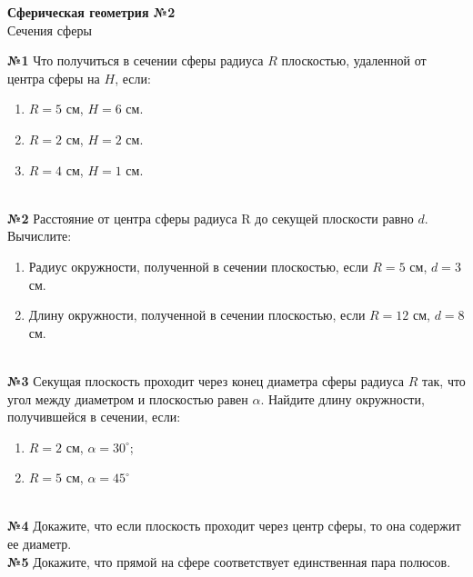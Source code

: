 


    \begin{center}
        \textbf{Сферическая геометрия №2}\\
        Сечения сферы
    \end{center}

    \textbf{№1} Что получиться в сечении сферы радиуса $R$ плоскостью, удаленной от центра сферы на $H$, если:\\

    \begin{enumerate}
        \setcounter{enumi}{0}
        \item $R = 5$ см, $H = 6$ см.

        \item $R = 2$ см, $H = 2$ см.

        \item $R = 4$ см, $H = 1$ см.

    \end{enumerate}\\

    \textbf{№2} Расстояние от центра сферы радиуса R до секущей плоскости равно $d$.
    Вычислите:
    \begin{enumerate}
        \item Радиус окружности, полученной в сечении плоскостью, если $R = 5$ см, $d = 3$ см.
        \item Длину окружности, полученной в сечении плоскостью, если $R = 12$ см, $d = 8$ см.
    \end{enumerate}\\

    \textbf{№3} Секущая плоскость проходит через конец диаметра сферы радиуса $R$ так,
    что угол между диаметром и плоскостью равен $\alpha$.
    Найдите длину окружности, получившейся в сечении, если:
    \begin{enumerate}
        \item $R = 2$ см, $\alpha = 30 ^{\circ}$;
        \item $R = 5$ см, $\alpha = 45 ^{\circ}$
    \end{enumerate}\\

    \textbf{№4} Докажите, что если плоскость проходит через центр сферы, то она содержит ее диаметр.\\

    \textbf{№5} Докажите, что прямой на сфере соответствует единственная пара полюсов.\\

